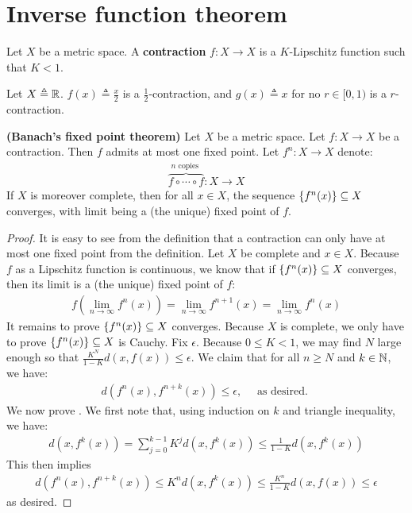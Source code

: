 \documentclass{report}
\begin{document}
\section{Inverse function theorem}
Let $X$ be a metric space. A \textbf{contraction} $f:X\rightarrow X$ is a $K$-Lipschitz function such that $K<1$.  
\begin{example}
Let $X\triangleq \mathbb{R}$. $f(x)\triangleq \frac{x}{2}$ is a $\frac{1}{2}$-contraction, and $g(x)\triangleq x$ for no $r\in [0,1)$ is a $r$-contraction.  
\end{example}
\begin{theorem}
\textbf{(Banach's fixed point theorem)}  Let $X$ be a metric space. Let $f:X\rightarrow X$ be a contraction. Then $f$ admits at most one fixed point. Let $f^n:X\rightarrow X$ denote: 
\begin{align*}
\overbrace{f\circ \cdots \circ f}^{n\text{ copies }}:X\rightarrow X
\end{align*}
If $X$ is moreover complete, then for all $x \in X$, the sequence $\left\{ f^n(x) \right\}\subseteq X$ converges, with limit being a (the unique) fixed point of $f$. 
\end{theorem}
\begin{proof}
It is easy to see from the definition that a contraction can only have at most one fixed point from the definition. Let $X$ be complete and $x \in X$. Because $f$ as a Lipschitz function is continuous, we know that if $\left\{ f^n(x) \right\}\subseteq X$  converges, then its limit is a (the unique) fixed point of $f$: 
\begin{align*}
f \left(\lim_{n\to \infty}f^n(x)\right)=\lim_{n\to \infty}f^{n+1}(x)=\lim_{n\to \infty}f^n(x)
\end{align*}
It remains to prove  $\left\{ f^n(x) \right\}\subseteq X$ converges. Because $X$ is complete, we only have to prove  $\left\{ f^n(x) \right\}\subseteq X$ is Cauchy. Fix $\epsilon $. Because $0\leq K<1$, we may find $N$ large enough so that $\frac{K^N}{1-K}d(x,f(x))\leq \epsilon $. We claim that for all $n\geq N$ and $k\in\mathbb{N}$, we have: 
\begin{align}
\label{EQdfnk}
d(f^n(x),f^{n+k}(x))\leq \epsilon,\quad \text{ as desired. }
\end{align}
We now prove . We first note that, using induction on $k$ and triangle inequality, we have: 
\begin{align*}
d(x,f^k(x))= \sum_{j=0}^{k-1}K^j d(x,f^k(x)) \leq \frac{1}{1-K} d(x,f^k(x))
\end{align*}
This then implies 
\begin{align*}
d(f^n(x),f^{n+k}(x))\leq K^n d(x,f^k(x))  \leq \frac{K^n}{1-K} d(x,f(x))\leq \epsilon 
\end{align*}
as desired.
\end{proof}
\end{document}
